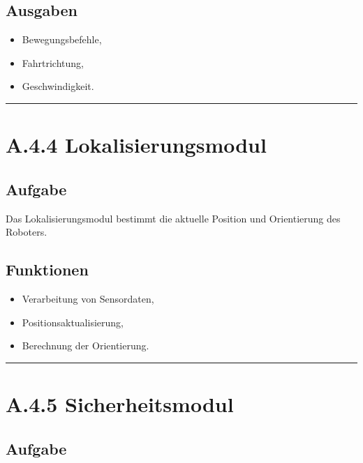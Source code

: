\documentclass[
  a4paper,
  12pt,
  DIV=12,        %
  parskip=half,  %
  headings=small %
]{scrartcl}
\theoremstyle{definition}
\providecommand{\tightlist}{%
  \setlength{\itemsep}{0pt}\setlength{\parskip}{0pt}}
\theoremstyle{definition}
\providecommand{\tightlist}{%
  \setlength{\itemsep}{0pt}\setlength{\parskip}{0pt}}
\begin{document}
\subsection{Ausgaben}\label{ausgaben}

\begin{itemize}
\tightlist
\item
  Bewegungsbefehle,
\item
  Fahrtrichtung,
\item
  Geschwindigkeit.
\end{itemize}

\begin{center}\rule{0.5\linewidth}{0.5pt}\end{center}

\section{A.4.4 Lokalisierungsmodul}\label{a.4.4-lokalisierungsmodul}

\subsection{Aufgabe}\label{aufgabe-8}

Das Lokalisierungsmodul bestimmt die aktuelle Position und Orientierung
des Roboters.

\subsection{Funktionen}\label{funktionen-2}

\begin{itemize}
\tightlist
\item
  Verarbeitung von Sensordaten,
\item
  Positionsaktualisierung,
\item
  Berechnung der Orientierung.
\end{itemize}

\begin{center}\rule{0.5\linewidth}{0.5pt}\end{center}

\section{A.4.5 Sicherheitsmodul}\label{a.4.5-sicherheitsmodul}

\subsection{Aufgabe}\label{aufgabe-9}
\end{document}
